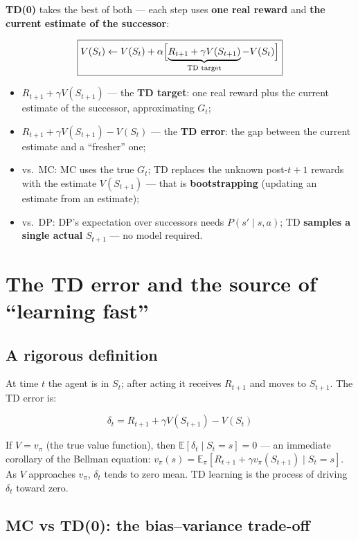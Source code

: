 \documentclass{article}
\begin{document}
\textbf{TD(0)} takes the best of both --- each step uses \textbf{one real reward} and \textbf{the current estimate of the successor}:

\[
\boxed{V(S_t) \leftarrow V(S_t) + \alpha\Bigl[\underbrace{R_{t+1} + \gamma V(S_{t+1})}_{\text{TD target}} - V(S_t)\Bigr]}
\]

\begin{itemize}
  \item $R_{t+1} + \gamma V(S_{t+1})$ --- the \textbf{TD target}: one real reward plus the current estimate of the successor, approximating $G_t$;
  \item $R_{t+1} + \gamma V(S_{t+1}) - V(S_t)$ --- the \textbf{TD error}: the gap between the current estimate and a ``fresher'' one;
  \item vs.\ MC: MC uses the true $G_t$; TD replaces the unknown post-$t{+}1$ rewards with the estimate $V(S_{t+1})$ --- that is \textbf{bootstrapping} (updating an estimate from an estimate);
  \item vs.\ DP: DP's expectation over successors needs $P(s'\mid s,a)$; TD \textbf{samples a single actual} $S_{t+1}$ --- no model required.
\end{itemize}

\section*{The TD error and the source of ``learning fast''}

\subsection*{A rigorous definition}

At time $t$ the agent is in $S_t$; after acting it receives $R_{t+1}$ and moves to $S_{t+1}$. The TD error is:

\[
\boxed{\delta_t = R_{t+1} + \gamma V(S_{t+1}) - V(S_t)}
\]

If $V = v_\pi$ (the true value function), then $\mathbb{E}[\delta_t \mid S_t=s]=0$ --- an immediate corollary of the Bellman equation:
$v_\pi(s) = \mathbb{E}_\pi[R_{t+1}+\gamma v_\pi(S_{t+1})\mid S_t=s]$. As $V$ approaches $v_\pi$, $\delta_t$ tends to zero mean. TD learning is the process of driving $\delta_t$ toward zero.

\subsection*{MC vs TD(0): the bias--variance trade-off}
\end{document}
